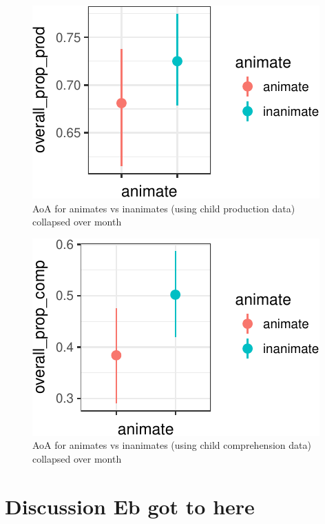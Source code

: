 \documentclass[10pt, letterpaper]{article}
\newenvironment{CodeChunk}{}{}
\begin{document}
\begin{CodeChunk}
\begin{figure}[tb]
\includegraphics{figs/animacy-aoa-prod-graph-1} \caption[AoA for animates vs inanimates (using child production data) collapsed over month]{AoA for animates vs inanimates (using child production data) collapsed over month}\label{fig:animacy-aoa-prod-graph}
\end{figure}
\end{CodeChunk}

\begin{CodeChunk}
\begin{figure}[tb]
\includegraphics{figs/animacy-aoa-comp-graph-1} \caption[AoA for animates vs inanimates (using child comprehension data) collapsed over month]{AoA for animates vs inanimates (using child comprehension data) collapsed over month}\label{fig:animacy-aoa-comp-graph}
\end{figure}
\end{CodeChunk}

\section{\texorpdfstring{Discussion \textbf{Eb got to
here}}{Discussion Eb got to here}}\label{discussion-eb-got-to-here}
\end{document}
